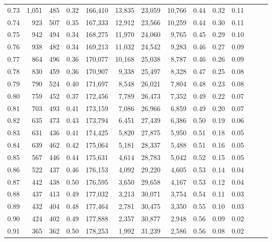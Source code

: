 \begin{tabular}{rrrrrrrrrrrrrr}
0.73 &  1,051 &  485 &  0.32 &  166,410 &   13,835 &  23,059 &  10,766 &  0.44 &  0.32 &      0.11 \\
0.74 &    923 &  507 &  0.35 &  167,333 &   12,912 &  23,566 &  10,259 &  0.44 &  0.30 &      0.11 \\
0.75 &    942 &  494 &  0.34 &  168,275 &   11,970 &  24,060 &   9,765 &  0.45 &  0.29 &      0.10 \\
0.76 &    938 &  482 &  0.34 &  169,213 &   11,032 &  24,542 &   9,283 &  0.46 &  0.27 &      0.09 \\
0.77 &    864 &  496 &  0.36 &  170,077 &   10,168 &  25,038 &   8,787 &  0.46 &  0.26 &      0.09 \\
0.78 &    830 &  459 &  0.36 &  170,907 &    9,338 &  25,497 &   8,328 &  0.47 &  0.25 &      0.08 \\
0.79 &    790 &  524 &  0.40 &  171,697 &    8,548 &  26,021 &   7,804 &  0.48 &  0.23 &      0.08 \\
0.80 &    759 &  452 &  0.37 &  172,456 &    7,789 &  26,473 &   7,352 &  0.49 &  0.22 &      0.07 \\
0.81 &    703 &  493 &  0.41 &  173,159 &    7,086 &  26,966 &   6,859 &  0.49 &  0.20 &      0.07 \\
0.82 &    635 &  473 &  0.43 &  173,794 &    6,451 &  27,439 &   6,386 &  0.50 &  0.19 &      0.06 \\
0.83 &    631 &  436 &  0.41 &  174,425 &    5,820 &  27,875 &   5,950 &  0.51 &  0.18 &      0.05 \\
0.84 &    639 &  462 &  0.42 &  175,064 &    5,181 &  28,337 &   5,488 &  0.51 &  0.16 &      0.05 \\
0.85 &    567 &  446 &  0.44 &  175,631 &    4,614 &  28,783 &   5,042 &  0.52 &  0.15 &      0.05 \\
0.86 &    522 &  437 &  0.46 &  176,153 &    4,092 &  29,220 &   4,605 &  0.53 &  0.14 &      0.04 \\
0.87 &    442 &  438 &  0.50 &  176,595 &    3,650 &  29,658 &   4,167 &  0.53 &  0.12 &      0.04 \\
0.88 &    437 &  413 &  0.49 &  177,032 &    3,213 &  30,071 &   3,754 &  0.54 &  0.11 &      0.03 \\
0.89 &    432 &  404 &  0.48 &  177,464 &    2,781 &  30,475 &   3,350 &  0.55 &  0.10 &      0.03 \\
0.90 &    424 &  402 &  0.49 &  177,888 &    2,357 &  30,877 &   2,948 &  0.56 &  0.09 &      0.02 \\
0.91 &    365 &  362 &  0.50 &  178,253 &    1,992 &  31,239 &   2,586 &  0.56 &  0.08 &      0.02 \\

\end{tabular}
